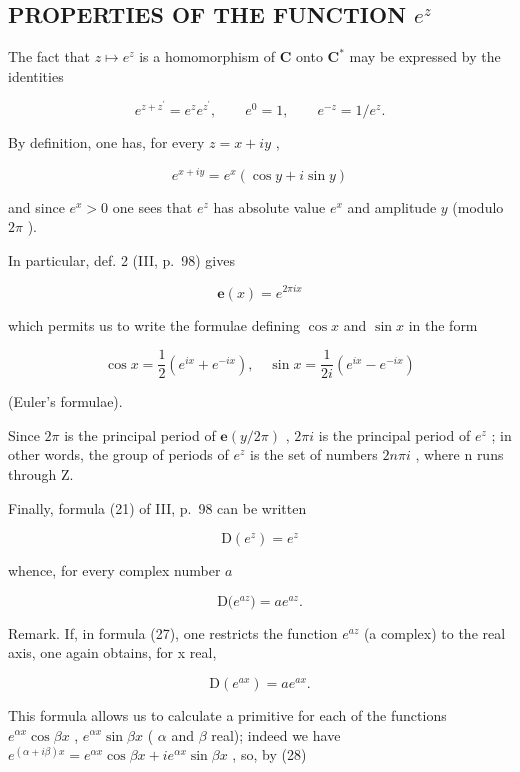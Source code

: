 \subsection{\texorpdfstring{PROPERTIES OF THE FUNCTION \(e^{z}\)}{PROPERTIES OF THE FUNCTION E TO THE Z}}

The fact that \(z \mapsto e^z\) is a homomorphism of \(\mathbf{C}\) onto \(\mathbf{C}^*\) may be expressed by the identities

\[
e ^ {z + z ^ {\prime}} = e ^ {z} e ^ {z ^ {\prime}}, \qquad e ^ {0} = 1, \qquad e ^ {- z} = 1 / e ^ {z}.\tag{22}
\]

By definition, one has, for every \(z = x + iy\) ,

\[
e ^ {x + i y} = e ^ {x} (\cos y + i \sin y)\tag{23}
\]

and since \(e^x > 0\) one sees that \(e^z\) has absolute value \(e^x\) and amplitude \(y\) (modulo \(2\pi\) ).

In particular, def. 2 (III, p.~98) gives

\[
\mathbf {e} (x) = e ^ {2 \pi i x}\tag{24}
\]

which permits us to write the formulae defining \(\cos x\) and \(\sin x\) in the form

\[
\cos x = \frac {1}{2} \left(e ^ {i x} + e ^ {- i x}\right), \quad \sin x = \frac {1}{2 i} \left(e ^ {i x} - e ^ {- i x}\right)\tag{25}
\]

(Euler's formulae).

Since \(2\pi\) is the principal period of \(\mathbf{e}(y/2\pi)\) , \(2\pi i\) is the principal period of \(e^{z}\) ; in other words, the group of periods of \(e^{z}\) is the set of numbers \(2n\pi i\) , where n runs through Z.

Finally, formula (21) of III, p.~98 can be written

\[
\mathrm{D} \left(e ^ {z}\right) = e ^ {z}\tag{26}
\]

whence, for every complex number \(a\)

\[
\mathrm{D} \big (e ^ {a z} \big) = a e ^ {a z}.\tag{27}
\]

Remark. If, in formula (27), one restricts the function \(e^{az}\) (a complex) to the real axis, one again obtains, for x real,

\[
\mathrm{D} (e ^ {a x}) = a e ^ {a x}.\tag{28}
\]

This formula allows us to calculate a primitive for each of the functions \(e^{\alpha x} \cos \beta x\) , \(e^{\alpha x} \sin \beta x\) ( \(\alpha\) and \(\beta\) real); indeed we have \(e^{(\alpha + i\beta)x} = e^{\alpha x} \cos \beta x + ie^{\alpha x} \sin \beta x\) , so, by (28)

